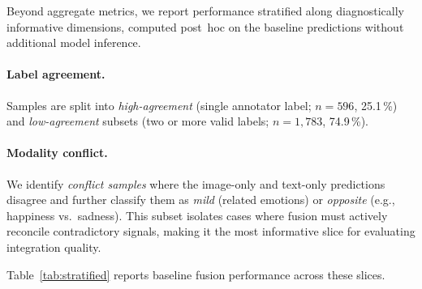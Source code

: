 Beyond aggregate metrics, we report performance stratified along
diagnostically informative dimensions, computed post~hoc on the baseline
predictions without additional model inference.

\paragraph{Label agreement.}
Samples are split into \emph{high-agreement} (single annotator label;
$n\!=\!596$, 25.1\,\%) and \emph{low-agreement} subsets (two or more
valid labels; $n\!=\!1{,}783$, 74.9\,\%).

\paragraph{Modality conflict.}
We identify \emph{conflict samples} where the image-only and text-only
predictions disagree and further classify them as \emph{mild} (related
emotions) or \emph{opposite} (e.g., happiness vs.\ sadness).  This
subset isolates cases where fusion must actively reconcile contradictory
signals, making it the most informative slice for evaluating integration
quality.

\medskip
Table~\ref{tab:stratified} reports baseline fusion performance across
these slices.

\begin{table}[t]
\centering
\caption{Stratified analysis (baseline, LLaVA-NeXT 0-shot).
MAcc = multi-label accuracy.}
\label{tab:stratified}
\end{table}

